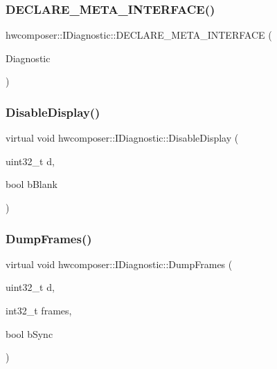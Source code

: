 \subsubsection{\texorpdfstring{D\+E\+C\+L\+A\+R\+E\+\_\+\+M\+E\+T\+A\+\_\+\+I\+N\+T\+E\+R\+F\+A\+C\+E()}{DECLARE\_META\_INTERFACE()}}
{\footnotesize\ttfamily hwcomposer\+::\+I\+Diagnostic\+::\+D\+E\+C\+L\+A\+R\+E\+\_\+\+M\+E\+T\+A\+\_\+\+I\+N\+T\+E\+R\+F\+A\+CE (\begin{DoxyParamCaption}\item[{Diagnostic}]{ }\end{DoxyParamCaption})}

\mbox{\label{classhwcomposer_1_1IDiagnostic_ad5ea1c34401b325c6d795f9417c2cd89}} 
\subsubsection{\texorpdfstring{Disable\+Display()}{DisableDisplay()}}
{\footnotesize\ttfamily virtual void hwcomposer\+::\+I\+Diagnostic\+::\+Disable\+Display (\begin{DoxyParamCaption}\item[{uint32\+\_\+t}]{d,  }\item[{bool}]{b\+Blank }\end{DoxyParamCaption})\hspace{0.3cm}{\ttfamily [pure virtual]}}

\mbox{\label{classhwcomposer_1_1IDiagnostic_ad3e81bebcbc3bf7dac6431eb50a33304}} 
\subsubsection{\texorpdfstring{Dump\+Frames()}{DumpFrames()}}
{\footnotesize\ttfamily virtual void hwcomposer\+::\+I\+Diagnostic\+::\+Dump\+Frames (\begin{DoxyParamCaption}\item[{uint32\+\_\+t}]{d,  }\item[{int32\+\_\+t}]{frames,  }\item[{bool}]{b\+Sync }\end{DoxyParamCaption})\hspace{0.3cm}{\ttfamily [pure virtual]}}

